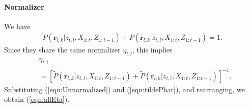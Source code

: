\documentclass[letterpaper, 10pt, conference]{ieeeconf}
\newcommand{\refeqn}[1]{(\ref{eqn:#1})}
\begin{document}
\begin{appendix}
\paragraph{Normalizer}
We have 
\begin{align*}
P(\mathbf{r}_{l,k}|z_{t,l},X_{1:t},Z_{1:t-1})+
P(\bar{\mathbf{r}}_{l,k}|z_{t,l},X_{1:t},Z_{1:t-1})=1.
\end{align*}
Since they share the same normalizer $\eta_{t,l}$, this implies 
\begin{align*}
&\eta_{t,l}\nonumber\\&=[\tilde P(\mathbf{r}_{l,k}|z_{t,l},X_{1:t},Z_{1:t-1})+
\tilde P(\bar{\mathbf{r}}_{l,k}|z_{t,l},X_{1:t},Z_{1:t-1})]^{-1}.
\end{align*}
Substituting \refeqn{Unnormalized} and \refeqn{tildePbar}, and rearranging, we obtain \refeqn{allEta}.
%


\end{appendix}





\end{document}
